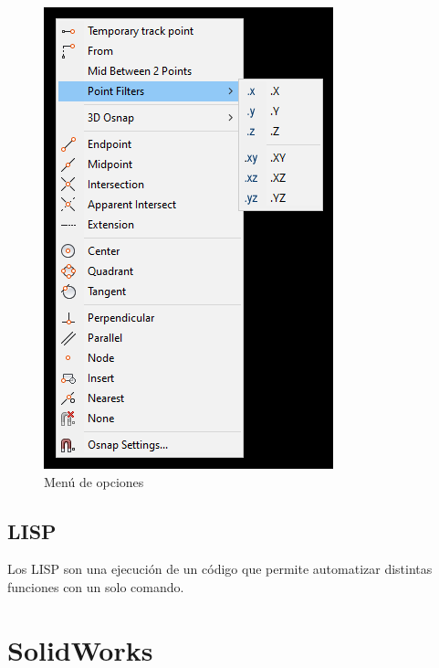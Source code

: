\documentclass{report}
\begin{document}
\begin{figure}[H]
	\centering
	\includegraphics[width=0.85\linewidth, height=0.45\textheight,keepaspectratio]{Imagenes/autocad_rightclickmenu01}
	\caption{Menú de opciones}
	\label{fig:autocadrightclickmenu01}
\end{figure}


\chapter{LISP}

Los LISP son una ejecución de un código que permite automatizar distintas funciones con un solo comando.







\part{SolidWorks}
\end{document}
